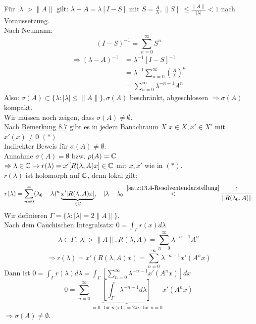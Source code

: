 \begin{beweis}
	Für $| \lambda | > \| A \|$ gilt: $\lambda - A = \lambda [I - S]$ mit $S = \frac{A}{\lambda}, \| S \| \leq \frac{\| A \|}{| \lambda |} < 1$ nach Voraussetzung. \\
	Nach Neumann: 
		\[ (I - S)^{-1}  = \sum_{n = 0}^{\infty} S^{n} \]
	\begin{align*}
		\Rightarrow (\lambda - A)^{-1} & = \lambda^{-1} [I - S]^{-1} \\
			& = \lambda^{-1} \sum_{n = 0}^{\infty} \left( \frac{A}{\lambda} \right)^{n} \\
			& = \sum_{n = 0}^{\infty} \lambda^{-n-1} A^{n}
	\end{align*}
	Also: $\sigma(A) \subset \{ \lambda: |\lambda| \leq \|A\| \}, \sigma(A)$ beschränkt, abgeschlossen $\Rightarrow \sigma(A)$ kompakt. \\
	Wir müssen noch zeigen, dass $\sigma(A) \neq \emptyset$. \\
	Nach \hyperref[bem:8.7]{Bemerkung 8.7} gibt es in jedem Banachraum $X$ $x \in X, x' \in X'$ mit $x'(x) \neq 0$ $(*)$ \label{eq:13.6.5-DualAbbildungAuf0} \\
	Indirekter Beweis für $\sigma(A) \neq \emptyset$. \\
	Annahme $\sigma(A) = \emptyset$ bzw. $\rho(A) = \mathbb{C}$ \\
	$\Rightarrow \lambda \in \mathbb{C} \rightarrow r(\lambda) = x'[R(\lambda, A)x] \in \mathbb{C}$ mit $x, x'$ wie in \hyperref[eq:13.6.5-DualAbbildungAuf0]{$(*)$}. \\
	$r(\lambda)$ ist holomorph auf $\mathbb{C}$, denn lokal gilt:
		\[ r(\lambda) = \sum_{n = 0}^{\infty} (\lambda_{0} - \lambda)^{n} \underbrace{x'[R(\lambda, A) x]}_{\in \mathbb{C}}, \quad |\lambda - \lambda_{0}| \overset{\ref{satz:13.4-Resolventendarstellung}}{<} \frac{1}{\| R(\lambda_{0}, A)\|} \]
	Wir definieren $\Gamma = \{ \lambda: |\lambda| = 2 \| A \| \}$. \\
	Nach dem Cauchischen Integralsatz: $0 = \int_{\Gamma} r(x) d\lambda$
	\[ \lambda \in \Gamma, |\lambda| > \| A \|, R(\lambda, A) = \sum_{n = 0}^{\infty} \lambda^{-n-1} A^{n} \]
	\[ \Rightarrow r(\lambda) = x'(R(\lambda, A)x) = \sum_{n = 0}^{\infty} \lambda^{-n-1} x'(A^{n}x) \]
	Dann ist $0 = \int_{\Gamma} r(\lambda) d\lambda = \int_{\Gamma} \left[ \sum_{n = 0}^{\infty} \lambda^{-n-1} x'(A^{n}x) \right] dx$
	\[ 0 = \sum_{n = 0}^{\infty} \underbrace{\left[ \int_{\Gamma} \lambda^{-n-1} d\lambda \right]}_{= 0, \text{ für } n > 0, = 2 \pi i,  \text{ für } n = 0} x'(A^{n} x) \]
	$\Rightarrow \sigma(A) \neq \emptyset$.
\end{beweis}


